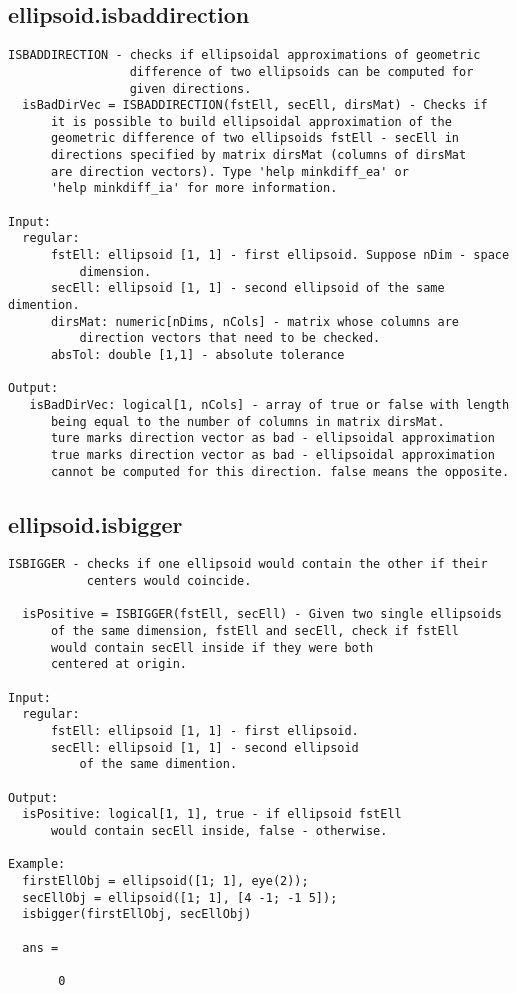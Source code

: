 \subsection{\texorpdfstring{ellipsoid.isbaddirection}{isbaddirection}}\label{method:ellipsoid.isbaddirection}
\begin{verbatim}
ISBADDIRECTION - checks if ellipsoidal approximations of geometric
                 difference of two ellipsoids can be computed for
                 given directions.
  isBadDirVec = ISBADDIRECTION(fstEll, secEll, dirsMat) - Checks if
      it is possible to build ellipsoidal approximation of the
      geometric difference of two ellipsoids fstEll - secEll in
      directions specified by matrix dirsMat (columns of dirsMat
      are direction vectors). Type 'help minkdiff_ea' or
      'help minkdiff_ia' for more information.

Input:
  regular:
      fstEll: ellipsoid [1, 1] - first ellipsoid. Suppose nDim - space
          dimension.
      secEll: ellipsoid [1, 1] - second ellipsoid of the same dimention.
      dirsMat: numeric[nDims, nCols] - matrix whose columns are
          direction vectors that need to be checked.
      absTol: double [1,1] - absolute tolerance

Output:
   isBadDirVec: logical[1, nCols] - array of true or false with length
      being equal to the number of columns in matrix dirsMat.
      ture marks direction vector as bad - ellipsoidal approximation
      true marks direction vector as bad - ellipsoidal approximation
      cannot be computed for this direction. false means the opposite.
\end{verbatim}
\subsection{\texorpdfstring{ellipsoid.isbigger}{isbigger}}\label{method:ellipsoid.isbigger}
\begin{verbatim}
ISBIGGER - checks if one ellipsoid would contain the other if their
           centers would coincide.

  isPositive = ISBIGGER(fstEll, secEll) - Given two single ellipsoids
      of the same dimension, fstEll and secEll, check if fstEll
      would contain secEll inside if they were both
      centered at origin.

Input:
  regular:
      fstEll: ellipsoid [1, 1] - first ellipsoid.
      secEll: ellipsoid [1, 1] - second ellipsoid
          of the same dimention.

Output:
  isPositive: logical[1, 1], true - if ellipsoid fstEll
      would contain secEll inside, false - otherwise.

Example:
  firstEllObj = ellipsoid([1; 1], eye(2));
  secEllObj = ellipsoid([1; 1], [4 -1; -1 5]);
  isbigger(firstEllObj, secEllObj)

  ans =

       0
\end{verbatim}
